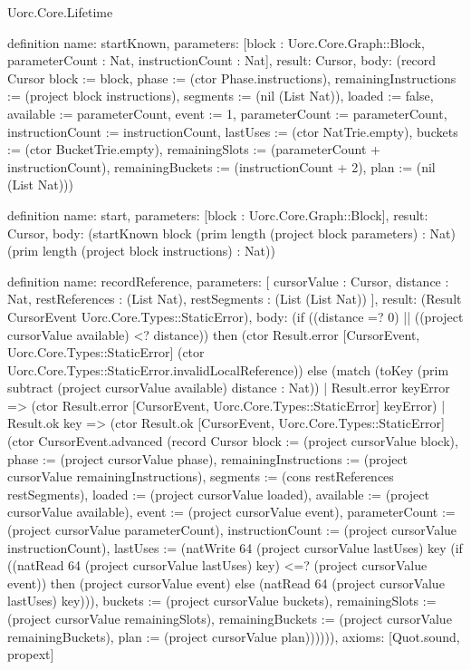 \begin{lexlean}{Uorc.Core.Lifetime}
\begin{semanticmodule}
definition{
  name: startKnown,
  parameters: [block : Uorc.Core.Graph::Block, parameterCount : Nat, instructionCount : Nat],
  result: Cursor,
  body: (record Cursor {block := block, phase := (ctor Phase.instructions), remainingInstructions := (project block instructions), segments := (nil (List Nat)), loaded := false, available := parameterCount, event := 1, parameterCount := parameterCount, instructionCount := instructionCount, lastUses := (ctor NatTrie.empty), buckets := (ctor BucketTrie.empty), remainingSlots := (parameterCount + instructionCount), remainingBuckets := (instructionCount + 2), plan := (nil (List Nat))})
}

definition{
  name: start,
  parameters: [block : Uorc.Core.Graph::Block],
  result: Cursor,
  body: (startKnown block (prim length (project block parameters) : Nat) (prim length (project block instructions) : Nat))
}

definition{
  name: recordReference,
  parameters: [
    cursorValue : Cursor,
    distance : Nat,
    restReferences : (List Nat),
    restSegments : (List (List Nat))
  ],
  result: (Result CursorEvent Uorc.Core.Types::StaticError),
  body: (if ((distance =? 0) || ((project cursorValue available) <? distance)) then (ctor Result.error [CursorEvent, Uorc.Core.Types::StaticError] (ctor Uorc.Core.Types::StaticError.invalidLocalReference)) else (match (toKey (prim subtract (project cursorValue available) distance : Nat))
    | Result.error keyError => (ctor Result.error [CursorEvent, Uorc.Core.Types::StaticError] keyError)
    | Result.ok key => (ctor Result.ok [CursorEvent, Uorc.Core.Types::StaticError] (ctor CursorEvent.advanced (record Cursor {block := (project cursorValue block), phase := (project cursorValue phase), remainingInstructions := (project cursorValue remainingInstructions), segments := (cons restReferences restSegments), loaded := (project cursorValue loaded), available := (project cursorValue available), event := (project cursorValue event), parameterCount := (project cursorValue parameterCount), instructionCount := (project cursorValue instructionCount), lastUses := (natWrite 64 (project cursorValue lastUses) key (if ((natRead 64 (project cursorValue lastUses) key) <=? (project cursorValue event)) then (project cursorValue event) else (natRead 64 (project cursorValue lastUses) key))), buckets := (project cursorValue buckets), remainingSlots := (project cursorValue remainingSlots), remainingBuckets := (project cursorValue remainingBuckets), plan := (project cursorValue plan)}))))),
  axioms: [Quot.sound, propext]
}


\end{semanticmodule}
\end{lexlean}
